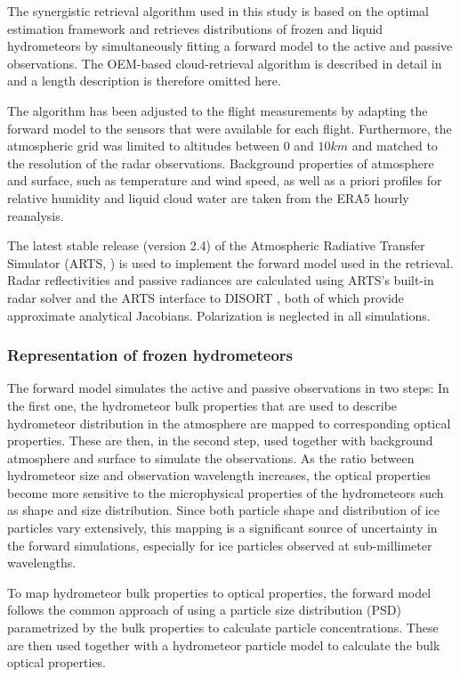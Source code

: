 \documentclass[journal abbreviation, manuscript]{copernicus}
\begin{document}
The synergistic retrieval algorithm used in this study is based on the optimal
estimation framework \citep{rodgers00} and retrieves distributions of frozen and
liquid hydrometeors by simultaneously fitting a forward model to the active and
passive observations. The OEM-based cloud-retrieval algorithm is described in
detail in \citet{pfreundschuh19} and a length description is therefore omitted
here.

The algorithm has been adjusted to the flight measurements by adapting the
forward model to the sensors that were available for each flight. Furthermore,
the atmospheric grid was limited to altitudes between $0$ and $10 \unit{km}$ and
matched to the resolution of the radar observations. Background properties of
atmosphere and surface, such as temperature and wind speed, as well as a priori
profiles for relative humidity and liquid cloud water are taken from the ERA5
hourly reanalysis.

The latest stable release (version 2.4) of the Atmospheric Radiative Transfer
Simulator (ARTS, \citet{arts18}) is used to implement the forward model used in
the retrieval. Radar reflectivities and passive radiances are calculated using
ARTS's built-in radar solver and the ARTS interface to DISORT \citep{disort00},
both of which provide approximate analytical Jacobians. Polarization is
neglected in all simulations.

\subsubsection{Representation of frozen hydrometeors}

The forward model simulates the active and passive observations in two steps: In
the first one, the hydrometeor bulk properties that are used to describe
hydrometeor distribution in the atmosphere are mapped to corresponding optical
properties. These are then, in the second step, used together with background
atmosphere and surface to simulate the observations. As the ratio between
hydrometeor size and observation wavelength increases, the optical properties
become more sensitive to the microphysical properties of the hydrometeors such
as shape and size distribution. Since both particle shape and distribution of
ice particles vary extensively, this mapping is a significant source of
uncertainty in the forward simulations, especially for ice particles observed at
sub-millimeter wavelengths.

To map hydrometeor bulk properties to optical properties, the forward model
follows the common approach of using a particle size distribution (PSD)
parametrized by the bulk properties to calculate particle concentrations. These
are then used together with a hydrometeor particle model to calculate the
bulk optical properties.
\end{document}
